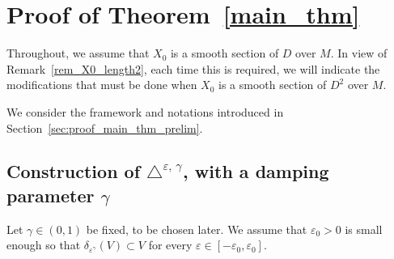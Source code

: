 \documentclass[10pt]{amsart}
\theoremstyle{definition}\newtheorem{defi}[theo]{Definition}\newtheorem{rema}[theo]{Remark}\newtheorem{exam}[theo]{Example}\newtheorem{exem}[theo]{Example}\newtheorem{nota}[theo]{Notation}
\begin{document}
\pagebreak

\section{Proof of Theorem~\ref{main_thm}}\label{sec:proof_main_thm}

Throughout, we assume that $X_0$ is a smooth section of $D$ over $M$. In view of Remark~\ref{rem_X0_length2}, each time this is required, we will indicate the modifications that must be done when $X_0$ is a smooth section of $D^2$ over $M$.

We consider the framework and notations introduced in Section~\ref{sec:proof_main_thm_prelim}.



\subsection{Construction of \texorpdfstring{$\triangle^{\varepsilon,\,\gamma}$}{triangle varepsilon, gamma}, with a damping parameter \texorpdfstring{$\gamma$}{gamma}}\label{sec_construction_deltaepsiloneta}
Let $\gamma\in(0,1)$ be fixed, to be chosen later. We assume that $\varepsilon_0>0$ is small enough so that $\delta_{\varepsilon^\gamma}(V)\subset V$ for every $\varepsilon\in[-\varepsilon_0,\varepsilon_0]$.
\end{document}
